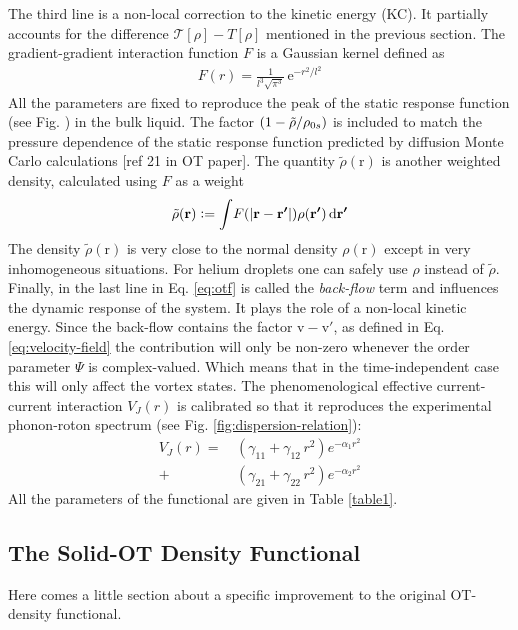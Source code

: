 \documentclass[12pt,a4paper]{book}
\renewcommand{\vec}[1]{\bm{\mathrm{#1}}}
\newcommand{\unit}[1]{\,\mathrm{#1}}
\newcommand{\diff}[1]{\,\mathrm{d}{\vec{#1}}}
\begin{document}
			The third line is a non-local correction to the kinetic energy (KC). It partially accounts for the difference $\mathcal{T}[\rho]-T[\rho]$ mentioned in the previous section. The gradient-gradient interaction function $F$ is a Gaussian kernel defined as
			\begin{align}
				F(r) = \frac{1}{l^3\sqrt{\pi^3}}\unit{e}^{-r^2/l^2}
			\end{align}
			All the parameters are fixed to reproduce the peak of the static response function (see Fig.  ) in the bulk liquid. The factor $\qty(1-\tilde{\rho}/\rho_{0s})$ is included to match the pressure dependence of the static response function predicted by diffusion Monte Carlo calculations [ref 21 in OT paper]. The quantity $\tilde{\rho}(\vec{r})$ is another weighted density, calculated using $F$ as a weight
			\begin{align}
				\tilde{\rho}(\vec{r}) \vcentcolon= \int\!F\qty(\abs{\vec{r}-\vec{r'}})\rho(\vec{r'})\diff{r'}
			\end{align}
			The density $\tilde{\rho}(\vec{r})$ is very close to the normal density $\rho(\vec{r})$ except in very inhomogeneous situations. For helium droplets one can safely use $\rho$ instead of $\tilde{\rho}$.\\
			
			Finally, in the last line in Eq. \ref{eq:otf} is called the \emph{back-flow} term and influences the dynamic response of the system. It plays the role of a non-local kinetic energy. Since the back-flow contains the factor $\vec{v}-\vec{v'}$, as defined in Eq. \ref{eq:velocity-field} the contribution will only be non-zero whenever the order parameter $\Psi$ is complex-valued. Which means that in the time-independent case this will only affect the vortex states. The phenomenological effective current-current interaction $V_J(r)$ is calibrated so that it reproduces the experimental phonon-roton spectrum (see Fig. \ref{fig:dispersion-relation}):
			\begin{align}
			V_J(r) =\,&(\gamma_{11} +\gamma_{12} \, r^2) e^{-\alpha_1 r^2}\\
				+\,&(\gamma_{21} +\gamma_{22} \, r^2) e^{-\alpha_2 r^2}
			\label{eq15}
			\end{align}
			All the parameters of the functional are given in Table \ref{table1}.

		\subsection{The Solid-OT Density Functional}
			Here comes a little section about a specific improvement to the original OT-density functional.
\end{document}
